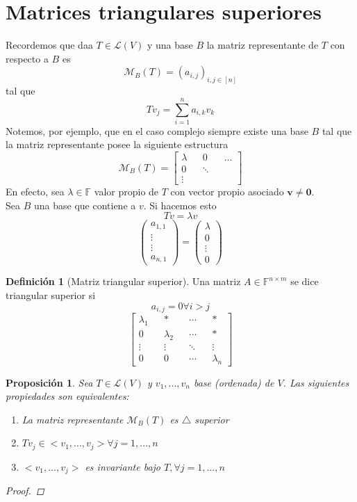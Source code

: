 \documentclass[11pt]{book}
\renewcommand{\vec}[1]{\mathbf{#1}}
\newcommand{\set}[1]{\mathbb{#1}}
\newtheorem{prop}[thm]{Proposición}
\theoremstyle{definition}
\newtheorem{defn}{Definición}[section]
\begin{document}
\section{Matrices triangulares superiores}
Recordemos que daa $T\in\mathcal{L}(V)$ y una base $B$ la matriz representante de $T$ con respecto a $B$ es
\[\mathcal{M}_B(T)=(a_{i,j})_{i,j\in[n]}\]
tal que
\[Tv_j=\sum^n_{i=1}a_{i,k}v_k\]
Notemos, por ejemplo, que en el caso complejo siempre existe una base $B$ tal que la matriz representante posee la siguiente estructura
\[\mathcal{M}_B(T)=\begin{bmatrix}\lambda && 0 && \ldots\\ 0 && \ddots\\ \vdots \end{bmatrix}\]
En efecto, sea $\lambda\in\set{F}$ valor propio de $T$ con vector propio asociado $\vec{v}\neq\vec{0}$.\\
Sea $B$ una base que contiene a $v$. Si hacemos esto
\[Tv=\lambda v\]
\[\begin{pmatrix}
		a_{1,1} \\
		\vdots  \\
		\vdots  \\
		a_{n,1}
	\end{pmatrix}=\begin{pmatrix}
		\lambda \\
		0       \\
		\vdots  \\
		0
	\end{pmatrix}\]
\begin{defn}[Matriz triangular superior]
	Una matriz $A\in\set{F}^{n\times m}$ se dice triangular superior si
	\[a_{i,j}=0\forall i>j\]
	\[\begin{bmatrix}
			\lambda_1 &  & *         &  & \cdots &  & *         \\
			0         &  & \lambda_2 &  & \cdots &  & *         \\
			\vdots    &  & \vdots    &  & \ddots &  & \vdots    \\
			0         &  & 0         &  & \cdots &  & \lambda_n
		\end{bmatrix}\]
\end{defn}
\begin{prop}
	Sea $T\in\mathcal{L}(V)$ y $v_1,...,v_n$ base (ordenada) de $V$. Las siguientes propiedades son equivalentes:
	\begin{enumerate}[label=\alph*)]
		\item La matriz representante $\mathcal{M}_B(T)$ es $\triangle$ superior

		\item $Tv_j\in<v_1,...,v_j>\forall j=1,...,n$

		\item $<v_1,...,v_j>$ es invariante bajo $T, \forall j=1,...,n$
	\end{enumerate}
	\begin{proof}

	\end{proof}
\end{prop}
\end{document}

